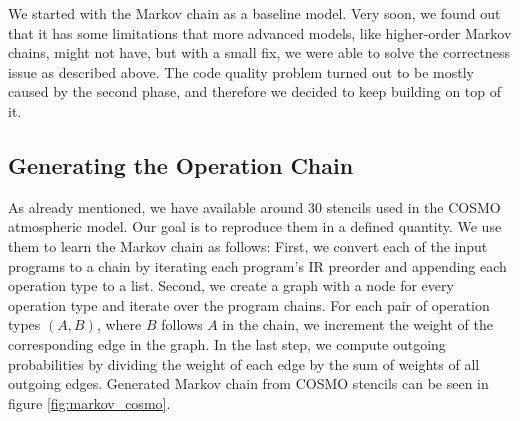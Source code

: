 \documentclass[sigplan,\review anonymous]{acmart}
\begin{document}
We started with the Markov chain as a baseline model. Very soon, we found out
that it has some limitations that more advanced models, like higher-order
Markov chains, might not have, but with a small fix, we were able to solve
the correctness issue as described above. The code quality problem turned out
to be mostly caused by the second phase, and therefore we decided to keep
building on top of it.

\subsection{Generating the Operation Chain}
As already mentioned, we have available around 30 stencils used in the COSMO
atmospheric model. Our goal is to reproduce them in a defined quantity. We use
them to learn the Markov chain as follows: First, we convert each of the input
programs to a chain by iterating each program's IR preorder and appending each
operation type to a list. Second, we create a graph with a node for every
operation type and iterate over the program chains. For each pair of operation
types $(A, B)$, where $B$ follows $A$ in the chain, we increment the weight of
the corresponding edge in the graph. In the last step, we compute outgoing
probabilities by dividing the weight of each edge by the sum of weights of all
outgoing edges. Generated Markov chain from COSMO stencils can be seen in
figure \ref{fig:markov_cosmo}.
\end{document}
